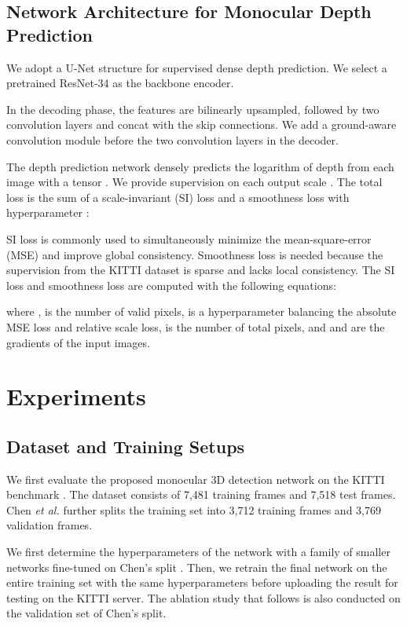 \documentclass[letterpaper, 10 pt, journal, twoside]{IEEEtran}
\begin{document}
\subsection{Network Architecture for Monocular Depth Prediction}
We adopt a U-Net \cite{UNetFB15Ronneberger} structure for supervised dense depth prediction.
We select a pretrained ResNet-34 \cite{He2015Resnet} as the backbone encoder. 

In the decoding phase, the features are bilinearly upsampled, followed by two convolution layers and concat with the skip connections. We add a ground-aware convolution module before the two convolution layers in the decoder.

The depth prediction network densely predicts the logarithm of depth from each image with a  tensor . We provide supervision on each output scale . The total loss is the sum of a scale-invariant (SI) loss  \cite{diaz2019SoftDorn} and a smoothness loss  \cite{monodepth17} with hyperparameter :

SI loss is commonly used to simultaneously minimize the mean-square-error (MSE) and improve global consistency.
Smoothness loss is needed because the supervision from the KITTI dataset \cite{Geiger2012KITTI} is sparse and lacks local consistency.
The SI loss and smoothness loss are computed with the following equations:

where ,  is the number of valid pixels,   is a hyperparameter balancing the absolute MSE loss and relative scale loss,  is the number of total pixels, and  and  are the gradients of the input images.



 


\section{Experiments}
\label{section:Experiments}

\subsection{Dataset and Training Setups}

We first evaluate the proposed monocular 3D detection network on the KITTI benchmark \cite{Geiger2012KITTI}. The dataset consists of 7,481 training frames and 7,518 test frames.
Chen \textit{et al.} \cite{Chen2015kittisplit} further splits the training set into 3,712 training frames and 3,769 validation frames.

We first determine the hyperparameters of the network with a family of smaller networks fine-tuned on Chen's split \cite{Chen2015kittisplit}.
Then, we retrain the final network on the entire training set with the same hyperparameters before uploading the result for testing on the KITTI server. 
The ablation study that follows is also conducted on the validation set of Chen's split.
\end{document}
